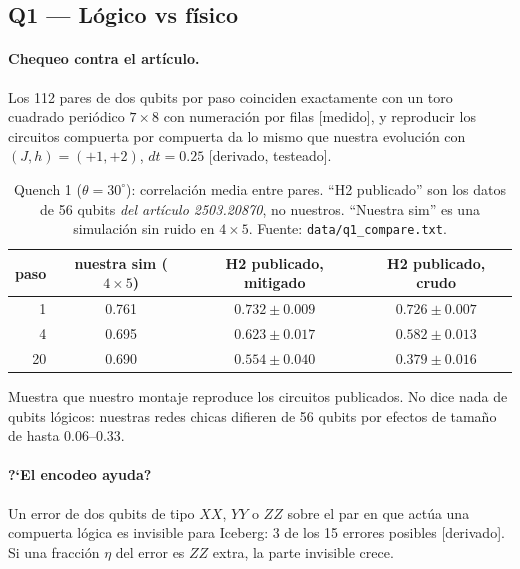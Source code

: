 \documentclass[11pt,a4paper]{article}
\newcommand{\code}[1]{\nolinkurl{#1}}
\begin{document}
\subsection{Q1 --- L\'ogico vs f\'isico}

\paragraph{Chequeo contra el art\'iculo.} Los 112 pares de dos qubits por paso coinciden exactamente con un toro
cuadrado peri\'odico $7\times8$ con numeraci\'on por filas [medido], y reproducir los circuitos compuerta por
compuerta da lo mismo que nuestra evoluci\'on con $(J,h)=(+1,+2)$, $dt=0.25$ [derivado, testeado].

\begin{table}[h]\centering\small
\caption{Quench 1 ($\theta=30^\circ$): correlaci\'on media entre pares. ``H2 publicado'' son los datos
de 56 qubits \emph{del art\'iculo 2503.20870}, no nuestros. ``Nuestra sim'' es una simulaci\'on sin ruido
en $4\times5$. Fuente: \code{data/q1\_compare.txt}.}
\begin{tabular}{rccc}
\toprule
paso & nuestra sim ($4\times5$) & H2 publicado, mitigado & H2 publicado, crudo\\
\midrule
1 & 0.761 & $0.732\pm0.009$ & $0.726\pm0.007$\\
4 & 0.695 & $0.623\pm0.017$ & $0.582\pm0.013$\\
20 & 0.690 & $0.554\pm0.040$ & $0.379\pm0.016$\\
\bottomrule
\end{tabular}
\end{table}
\noindent Muestra que nuestro montaje reproduce los circuitos publicados. No dice nada de qubits
l\'ogicos: nuestras redes chicas difieren de 56 qubits por efectos de tama\~no de hasta 0.06--0.33.

\paragraph{?`El encodeo ayuda?} Un error de dos qubits de tipo $XX$, $YY$ o $ZZ$ sobre el par en
que act\'ua una compuerta l\'ogica es invisible para Iceberg: 3 de los 15 errores posibles [derivado].
Si una fracci\'on $\eta$ del error es $ZZ$ extra, la parte invisible crece.
\end{document}
